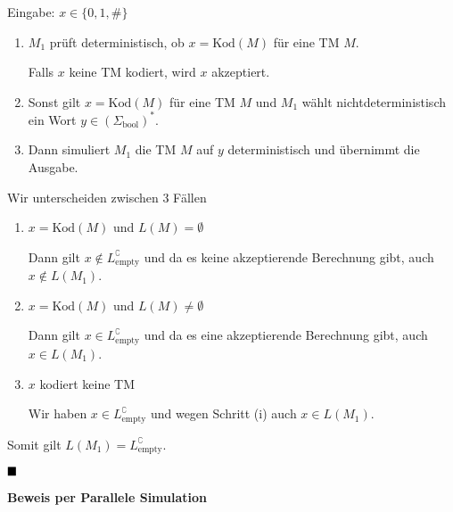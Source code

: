                 Eingabe: $x \in \{0,1,\#\}$
                \begin{enumerate}[label=(\roman*)]
                    \item $M_1$ prüft deterministisch, ob $x = \text{Kod}(M)$ für eine TM $M$. 
                    
                    Falls $x$ keine TM kodiert, wird $x$ akzeptiert.
                    
                    \item Sonst gilt $x = \text{Kod}(M)$ für eine TM $M$ und $M_1$ wählt nichtdeterministisch ein Wort $y \in (\Sigma_{\text{bool}})^*$. 
                    
                    \item Dann simuliert $M_1$ die TM $M$ auf $y$ deterministisch und übernimmt die Ausgabe. 
                \end{enumerate} 
            
            
                Wir unterscheiden zwischen 3 Fällen
                \begin{enumerate}[label = \Roman*]
                    
                    \item $x = \text{Kod}(M)$ und $L(M) = \emptyset$
                    
                    Dann gilt $x \notin L_{\text{empty}}^\complement$ und da es keine akzeptierende Berechnung gibt, auch $x \notin L(M_1)$.
                    
                    \item $x = \text{Kod}(M)$ und $L(M) \neq \emptyset$
                    
                    Dann gilt $x \in L_{\text{empty}}^\complement$ und da es eine akzeptierende Berechnung gibt, auch $x \in L(M_1)$.
                    
                    \item $x$ kodiert keine TM
                    
                    Wir haben $x \in L_{\text{empty}}^\complement$ und wegen Schritt (i) auch $x \in L(M_1)$.
                \end{enumerate}
                Somit gilt $L(M_1) = L_{\text{empty}}^\complement$.
            
                $\hfill\blacksquare$
        
                \textbf{Beweis per Parallele Simulation}
            
